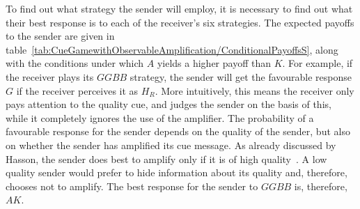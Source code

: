 \documentclass[a4paper,12pt]{article}
\numberwithin{equation}{section}
\begin{document}
To find out what strategy the sender will employ, it is necessary to find out what their best response is to each of the receiver's six strategies. The expected payoffs to the sender are given in table~\ref{tab:CueGamewithObservableAmplification/ConditionalPayoffsS}, along with the conditions under which $A$ yields a higher payoff than $K$. For example, if the receiver plays its $GGBB$ strategy, the sender will get the favourable response $G$ if the receiver perceives it as $H_{R}$. More intuitively, this means the receiver only pays attention to the quality cue, and judges the sender on the basis of this, while it completely ignores the use of the amplifier. The probability of a favourable response for the sender depends on the quality of the sender, but also on whether the sender has amplified its cue message. As already discussed by Hasson, the sender does best to amplify only if it is of high quality~\cite{Hasson1989}. A low quality sender would prefer to hide information about its quality and, therefore, chooses not to amplify. The best response for the sender to $GGBB$ is, therefore, $AK$.
\end{document}
